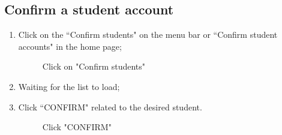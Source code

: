 \documentclass[ManualeUtente]{subfiles}
\begin{document}
\subsection{Confirm a student account}
\begin{enumerate}
	\item Click on the \textquotedblleft Confirm students" on the menu bar or \textquotedblleft Confirm student accounts" in the home page;
	\begin{figure}[H]
		\centering
		\caption{Click on "Confirm students"}
		\label{fig:Click on "Confirm students"}
	\end{figure}
	\item Waiting for the list to load;
	\item Click \textquotedblleft CONFIRM" related to the desired student.
	\begin{figure}[H]
		\centering
		\caption{Click "CONFIRM"}
		\label{fig:Click "CONFIRM"}
	\end{figure}
\end{enumerate}
\end{document}
